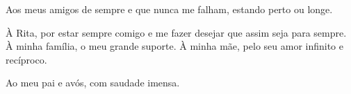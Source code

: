 \begin{acknowledgements}
\begin{otherlanguage}{portuguese}
Aos meus amigos de sempre e que nunca me falham, estando perto ou longe.

À Rita, por estar sempre comigo e me fazer desejar que assim seja para sempre. À minha família, o meu grande suporte. À minha mãe, pelo seu amor infinito e recíproco.

\vspace{11pt}

Ao meu pai e avós, com saudade imensa.

\end{otherlanguage}
\end{acknowledgements}

\addvspacetoc{0.3cm} %


